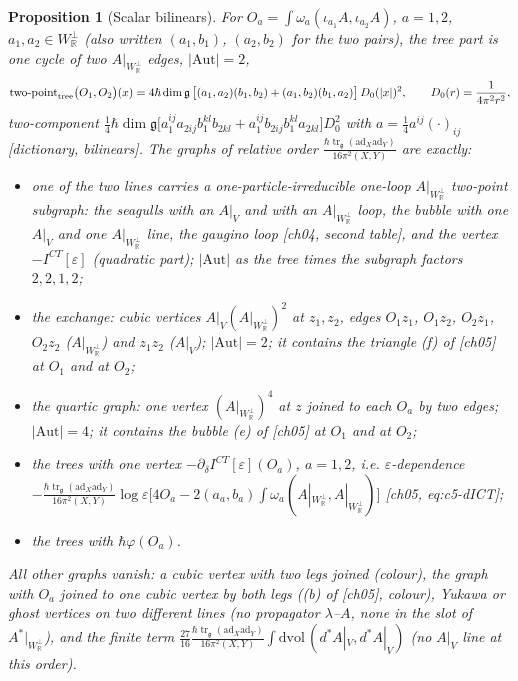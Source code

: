 \documentclass[11pt]{report}
\theoremstyle{plain}
\newtheorem{proposition}[theorem]{Proposition}
\theoremstyle{definition}
\numberwithin{equation}{chapter}
\newcommand{\unit}{\tfrac{\hbar\operatorname{tr}_{\mathfrak g}(\mathrm{ad}_X\mathrm{ad}_Y)}{16\pi^2(X,Y)}}
\newcommand{\Wp}{W_{\mathbb R}^\perp}
\newcommand{\TPz}[2]{\mathrm{two\mbox{-}point}_{\rm tree}\big(#1,#2\big)}
\begin{document}
\begin{proposition}[Scalar bilinears]
\label{prop:t-census-scalar}
For $O_a=\int\omega_a(\iota_{a_1}A,\iota_{a_2}A)$, $a=1,2$, $a_1,a_2\in\Wp$ (also written $(a_1,b_1)$, $(a_2,b_2)$ for the two pairs), the tree part is one cycle of two $A|_{\Wp}$ edges, $|\mathrm{Aut}|=2$,
\begin{equation}
\TPz{O_1}{O_2}(x)=4\hbar\dim\mathfrak g\,\big[(a_1,a_2)(b_1,b_2)+(a_1,b_2)(b_1,a_2)\big]\,D_0(|x|)^2,\qquad D_0(r)=\frac1{4\pi^2r^2},
\label{eq:t-tree}
\end{equation}
two-component $\tfrac14\hbar\dim\mathfrak g\big[a_1^{ij}a_{2ij}b_1^{kl}b_{2kl}+a_1^{ij}b_{2ij}b_1^{kl}a_{2kl}\big]D_0^2$ with $a=\tfrac14a^{ij}(\cdot)_{ij}$ [dictionary, bilinears]. The graphs of relative order $\unit$ are exactly:
\begin{itemize}
\item[(SE)] one of the two lines carries a one-particle-irreducible one-loop $A|_{\Wp}$ two-point subgraph: the seagulls with an $A|_V$ and with an $A|_{\Wp}$ loop, the bubble with one $A|_V$ and one $A|_{\Wp}$ line, the gaugino loop [ch04, second table], and the vertex $-I^{CT}[\varepsilon]$ (quadratic part); $|\mathrm{Aut}|$ as the tree times the subgraph factors $2,2,1,2$;
\item[(EX)] the exchange: cubic vertices $A|_V(A|_{\Wp})^2$ at $z_1,z_2$, edges $O_1z_1$, $O_1z_2$, $O_2z_1$, $O_2z_2$ ($A|_{\Wp}$) and $z_1z_2$ ($A|_V$); $|\mathrm{Aut}|=2$; it contains the triangle (f) of [ch05] at $O_1$ and at $O_2$;
\item[(QU)] the quartic graph: one vertex $(A|_{\Wp})^4$ at $z$ joined to each $O_a$ by two edges; $|\mathrm{Aut}|=4$; it contains the bubble (e) of [ch05] at $O_1$ and at $O_2$;
\item[(OC)] the trees with one vertex $-\partial_\delta I^{CT}[\varepsilon](O_a)$, $a=1,2$, i.e. $\varepsilon$-dependence $-\unit\log\varepsilon\big[4O_a-2(a_a,b_a)\int\omega_a(A|_{\Wp},A|_{\Wp})\big]$ [ch05, eq:c5-dICT];
\item[(F)] the trees with $\hbar\varphi(O_a)$.
\end{itemize}
All other graphs vanish: a cubic vertex with two legs joined (colour), the graph with $O_a$ joined to one cubic vertex by both legs ((b) of [ch05], colour), Yukawa or ghost vertices on two different lines (no propagator $\lambda$--$A$, none in the slot of $A^*|_{\Wp}$), and the finite term $\tfrac{27}{16}\unit\int\mathrm{dvol}\,(d^*A|_V,d^*A|_V)$ (no $A|_V$ line at this order).
\end{proposition}
\end{document}
